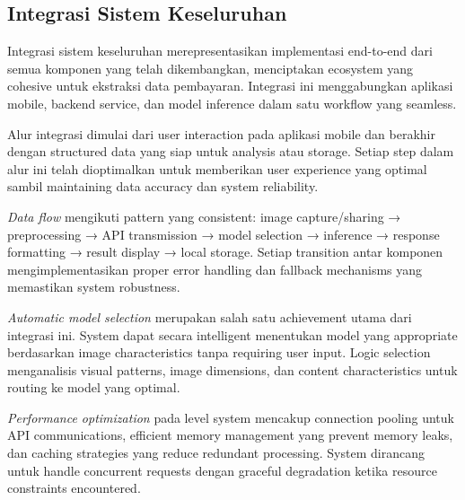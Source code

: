 \subsection{Integrasi Sistem Keseluruhan}
\label{subsec:integrasi-sistem-keseluruhan}

Integrasi sistem keseluruhan merepresentasikan implementasi end-to-end dari semua komponen yang telah dikembangkan, menciptakan ecosystem yang cohesive untuk ekstraksi data pembayaran. Integrasi ini menggabungkan aplikasi mobile, backend service, dan model inference dalam satu workflow yang seamless.


Alur integrasi dimulai dari user interaction pada aplikasi mobile dan berakhir dengan structured data yang siap untuk analysis atau storage. Setiap step dalam alur ini telah dioptimalkan untuk memberikan user experience yang optimal sambil maintaining data accuracy dan system reliability.

\emph{Data flow} mengikuti pattern yang consistent: image capture/sharing → preprocessing → API transmission → model selection → inference → response formatting → result display → local storage. Setiap transition antar komponen mengimplementasikan proper error handling dan fallback mechanisms yang memastikan system robustness.

\emph{Automatic model selection} merupakan salah satu achievement utama dari integrasi ini. System dapat secara intelligent menentukan model yang appropriate berdasarkan image characteristics tanpa requiring user input. Logic selection menganalisis visual patterns, image dimensions, dan content characteristics untuk routing ke model yang optimal.


\emph{Performance optimization} pada level system mencakup connection pooling untuk API communications, efficient memory management yang prevent memory leaks, dan caching strategies yang reduce redundant processing. System dirancang untuk handle concurrent requests dengan graceful degradation ketika resource constraints encountered.

